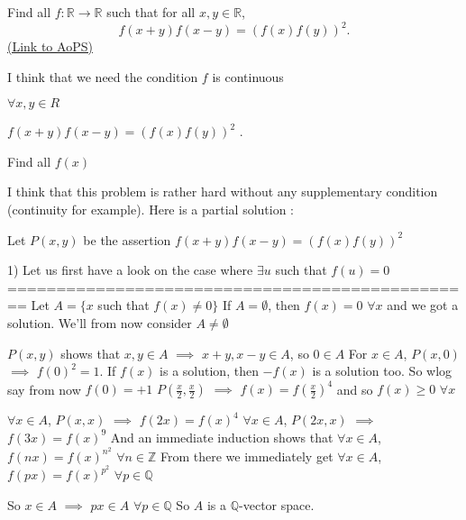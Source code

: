\begin{problem}
	Find all $ f: \mathbb{R}\to\mathbb{R}$ such that for all $x,y \in \mathbb R$,
\[f(x+y)f(x-y)=(f(x)f(y))^{2}.\]
	\flushright \href{https://artofproblemsolving.com/community/c6h311747}{(Link to AoPS)}
\end{problem}



\begin{solution}
	I think that we need the condition $ f$ is continuous
\end{solution}



\begin{solution}
	\begin{tcolorbox}$ \forall x,y\in R$ 

$ f(x + y)f(x - y) = (f(x)f(y))^{2}$ . 

Find all $ f(x)$\end{tcolorbox}

I think that this problem is rather hard without any supplementary condition (continuity for example).
Here is a partial solution :

Let $ P(x,y)$ be the assertion $ f(x + y)f(x - y) = (f(x)f(y))^2$

1) Let us first have a look on the case where $ \exists u$ such that $ f(u) = 0$
================================================
Let $ A = \{x$ such that $ f(x)\ne 0\}$
If $ A = \emptyset$, then $ f(x) = 0$ $ \forall x$ and we got a solution. We'll from now consider $ A\ne\emptyset$

$ P(x,y)$ shows that $ x,y\in A$ $ \implies$ $ x + y,x - y\in A$, so $ 0\in A$
For $ x\in A$, $ P(x,0)$ $ \implies$ $ f(0)^2 = 1$. 
If $ f(x)$ is a solution, then $ - f(x)$ is a solution too. So wlog say from now $ f(0) = + 1$
$ P(\frac x2,\frac x2)$ $ \implies$ $ f(x) = f(\frac x2)^4$ and so $ f(x)\ge 0$ $ \forall x$

$ \forall x\in A$, $ P(x,x)$ $ \implies$ $ f(2x) = f(x)^4$
$ \forall x\in A$, $ P(2x,x)$ $ \implies$ $ f(3x) = f(x)^9$
And an immediate induction shows that $ \forall x\in A$, $ f(nx) = f(x)^{n^2}$ $ \forall n\in\mathbb Z$
From there we immediately get $ \forall x\in A$, $ f(px) = f(x)^{p^2}$ $ \forall p\in\mathbb Q$

So $ x\in A$ $ \implies$ $ px\in A$ $ \forall p\in\mathbb Q$
So $ A$ is a $ \mathbb Q$-vector space.


\end{solution}
